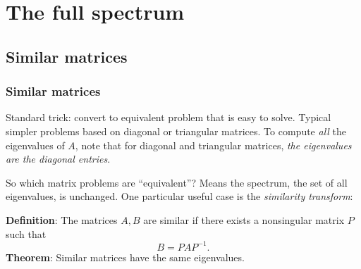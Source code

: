 \documentclass{beamer}
\begin{document}





\section{The full spectrum}


\subsection{Similar matrices}

\begin{frame}
  \frametitle{Similar matrices}

  Standard trick: convert to equivalent problem that is easy to
  solve. Typical simpler problems based on diagonal or triangular
  matrices. \pause To compute \emph{all} the eigenvalues of $A$, note that
  for diagonal and triangular matrices, \emph{the eigenvalues are the
    diagonal entries}. \pause

  \vspace{1ex}

  So which matrix problems are ``equivalent''? Means the spectrum, the
  set of all eigenvalues, is unchanged. One particular useful case is
  the \emph{similarity transform}:

  {\bf Definition}: The matrices $A,B$ are similar if there exists a
  nonsingular matrix $P$ such that
  \begin{equation*}
    B = P A P^{-1}.
  \end{equation*} \pause
  {\bf Theorem}: Similar matrices have the same eigenvalues.

\end{frame}
\end{document}
